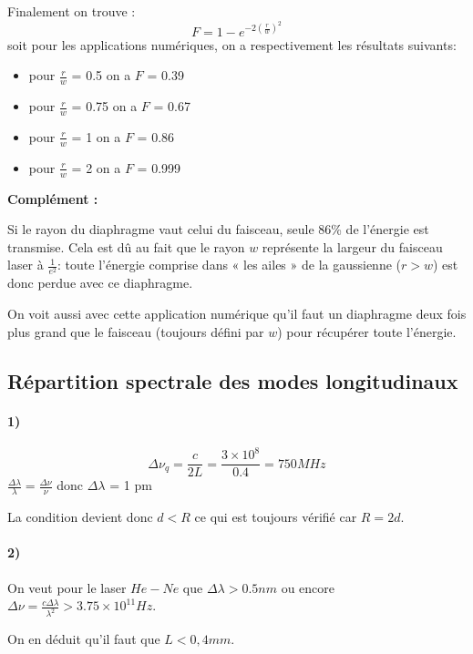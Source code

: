 \documentclass{book}
\begin{document}
Finalement on trouve :
\[F = 1-e^{-2\left(\frac rw\right)^2}\]
soit pour les applications numériques, on a respectivement les résultats suivants:

\begin{itemize}
    \item pour \(\frac rw\) = 0.5 on a \(F\) = 0.39
    \item pour \(\frac rw\) = 0.75 on a \(F\) = 0.67
    \item pour \(\frac rw\) = 1 on a \(F\) = 0.86
    \item pour \(\frac rw\) = 2 on a \(F\) = 0.999
\end{itemize}

\textbf{\color{remarque1}Complément :}  
\begin{mdframed}[linecolor=remarque1, backgroundcolor=remarque2]

Si le rayon du diaphragme vaut celui du faisceau, seule 86\% de l'énergie est transmise. Cela est dû au fait que le rayon \(w\) représente la largeur du faisceau laser à \(\frac 1{e^2}\): toute l'énergie comprise dans « les ailes » de la gaussienne (\(r > w\)) est donc perdue avec ce diaphragme.

On voit aussi avec cette application numérique qu'il faut un diaphragme deux fois plus grand que le faisceau (toujours défini par \(w\)) pour récupérer toute l'énergie.

\end{mdframed}

\subsection{Répartition spectrale des modes longitudinaux}

\paragraph{1)}
\[\Delta \nu_q = \frac c {2L} = \frac {3\times 10^8}{0.4} = 750MHz\] 
\(\frac {\Delta \lambda}{\lambda} = \frac {\Delta \nu}{\nu}\) donc \(\Delta \lambda\) = 1 pm
            
La condition devient donc \(d < R\) ce qui est toujours vérifié car \(R=2d\).
\paragraph{2)}
On veut pour le laser \(He-Ne\) que \(\Delta \lambda > 0.5nm\) ou encore \(\Delta \nu = \frac{c\Delta\lambda}{\lambda ^2} > 3.75\times 10^{11} Hz\).

On en déduit qu'il faut que \(L < 0,4 mm\).




\end{document}
